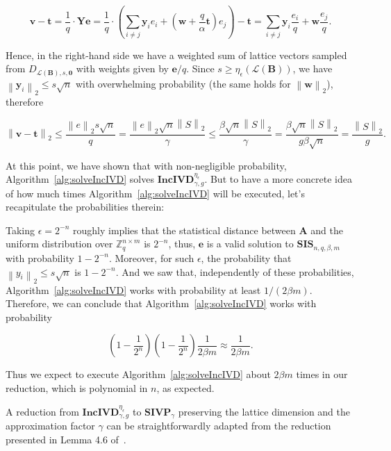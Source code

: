 \documentclass[a4paper,11pt]{article}
\let\vec\mathbf %
\newcommand\Zqnm{{\mathbb Z}_q^{n\times m}}
\newcommand\A{{\mathbf A}}
\newcommand\LB{\mathcal{L}\left(\vec B\right)}
\newcommand\DLs[1]{D_{\LB, s, #1}}
\newcommand\smooth{\eta_\epsilon}
\newcommand\SIS{\textbf{SIS}_{n, q, \beta, m}}
\newcommand\SIVP{\textbf{SIVP}_\gamma}
\newcommand\incIVD{\textbf{IncIVD}_{\gamma, g}^{\smooth}}
\newcommand{\norm}[1]{\left\lVert #1 \right\rVert_2}
\theoremstyle{definition}
\theoremstyle{remark}
\begin{document}
$$\vec v - \vec t =  \frac{1}{q} \cdot \vec Y \vec e = \frac{1}{q} \cdot \left( 
\sum_{i\not=j}\vec y_ie_i + \left(\vec{w} + \frac{q}{\alpha}\vec t\right) e_j 
\right) - \vec t = \sum_{i\not=j}\vec y_i\frac{e_i}{q} + \vec{w}\frac{e_j}{q}.$$

Hence, in the right-hand side we have a weighted sum of lattice vectors sampled 
from $\DLs{\vec 0}$ with weights given by $\vec e / q$. Since $s \ge 
\smooth(\LB)$, we have $\norm{\vec y_i} \le s\sqrt{n}$ with overwhelming 
probability (the same holds for $\norm{\vec w}$), therefore

$$\norm{\vec v - \vec t} \le \frac{\norm{e}s\sqrt{n}}{q} =  
\frac{\norm{e}\sqrt{n}\norm{S}}{\gamma} \le \frac{\beta\sqrt{n}\norm{S}}{ 
\gamma} = \frac{\beta\sqrt{n}\norm{S}}{g \beta \sqrt{n}} = \frac{\norm{S}}{g}.$$

At this point, we have shown that with non-negligible probability, 
Algorithm~\ref{alg:solveIncIVD} solves $\incIVD$. But to have a more concrete 
idea of how much times Algorithm~\ref{alg:solveIncIVD} will be executed, let's 
recapitulate the probabilities therein:

Taking $\epsilon = 2^{-n}$ roughly implies that the statistical distance 
between $\A$ and the uniform distribution over $\Zqnm$ is $2^{-n}$, thus, $\vec 
e$ is a valid solution to $\SIS$ with probability $1 - 2^{-n}$. Moreover, for 
such $\epsilon$, the probability that $\norm{y_i} \le s\sqrt{n}$ is $1-2^{-n}$. 
And we saw that, independently of these probabilities, 
Algorithm~\ref{alg:solveIncIVD} works with probability at least $1/(2\beta m)$. 
Therefore, we can conclude that Algorithm~\ref{alg:solveIncIVD} works with 
probability

$$\left(1-\frac{1}{2^n}\right)\left(1-\frac{1}{2^n}\right)\frac{1}{2\beta m} 
\approx \frac{1}{2\beta m}.$$

Thus we expect to execute Algorithm~\ref{alg:solveIncIVD} about $2\beta m$ 
times in our reduction, which is polynomial in $n$, as expected.

A reduction from $\incIVD$ to $\SIVP$ preserving the lattice dimension and the 
approximation factor $\gamma$ can be straightforwardly adapted from the 
reduction presented in Lemma 4.6 of~\cite{mic07}.



\end{document}
